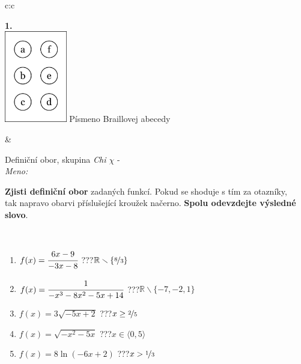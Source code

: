 \documentclass[10pt]{report}
\begin{document}
\begin{tabular}{c:c}
\begin{minipage}[c][104.5mm][t]{0.5\linewidth}
\begin{center}
\begin{minipage}{0.20\linewidth}
\begin{center}
{\Huge\bfseries 1.} \\[2mm]
\includegraphics[height=40mm]{../images/braille.png}
{\small Písmeno Braillovej abecedy}
\end{center}
\end{minipage}
\end{center}
\end{minipage}
&
\begin{minipage}[c][104.5mm][t]{0.5\linewidth}
\begin{center}
\vspace{7mm}
{\huge Definiční obor, skupina \textit{Chi $\chi$} -}\\[5mm]
\textit{Meno:}\phantom{xxxxxxxxxxxxxxxxxxxxxxxxxxxxxxxxxxxxxxxxxxxxxxxxxxxxxxxxxxxxxxxxx}\\[5mm]
\begin{minipage}{0.95\linewidth}
\textbf{Zjisti definiční obor} zadaných funkcí. Pokud se shoduje s tím za otazníky,\\tak napravo obarvi příslušející kroužek načerno. \textbf{Spolu odevzdejte výsledné slovo}.
\end{minipage}
\\[1mm]
\begin{minipage}{0.79\linewidth}
\begin{center}
\begin{varwidth}{\linewidth}
\begin{enumerate}
\normalsizerrr
\item $f(x)=\cfrac{6x-9}{-3x-8}$\quad \dotfill\; ???\;\dotfill \quad $\mathbb{R}\smallsetminus\{\nicefrac{8}{3}\}$
\item $f(x)=\cfrac{1}{-x^3-8x^2-5x+14}$\quad \dotfill\; ???\;\dotfill \quad $\mathbb{R}\smallsetminus\{-7,-2,1\}$
\item $f(x)=3\sqrt{-5x+2}$\quad \dotfill\; ???\;\dotfill \quad $x\geq\nicefrac{2}{5}$
\item $f(x)=\sqrt{-x^2-5x}$\quad \dotfill\; ???\;\dotfill \quad $x\in\langle0 , 5\rangle$
\item $f(x)=8\ln{(-6x+2)}$\quad \dotfill\; ???\;\dotfill \quad $x>\nicefrac{1}{3}$

\end{enumerate}
\end{varwidth}
\end{center}
\end{minipage}
\end{center}
\end{minipage}
\end{tabular}
\end{document}
